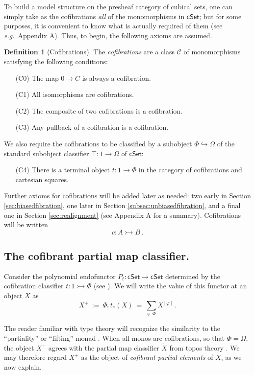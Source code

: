 \documentclass[11pt,reqno]{amsart}
\newcommand{\eg}{\emph{e.g.}}
\newcommand{\cSet}{\ensuremath{\mathsf{cSet}}}
\newcommand{\hook}{\ensuremath{\hookrightarrow}}
\newcommand{\mono}{\ensuremath{\rightarrowtail}}
\renewcommand{\to}{\ensuremath{\rightarrow}}
\theoremstyle{remark}
\theoremstyle{definition}
\newtheorem{definition}[theorem]{Definition}
\begin{document}
To build a model structure on the presheaf category of cubical sets, one can simply take as the cofibrations \emph{all} of the monomorphisms in $\cSet$; but for some purposes, it is convenient to know what is actually required of them (see \eg\ Appendix A). Thus, to begin, the following axioms are assumed.
 
\begin{definition}[Cofibrations]\label{def:cofibration}
The \emph{cofibrations} are a class $\mathcal{C}$ of monomorphisms satisfying the following conditions:
\begin{enumerate}
\item[(C0)] The map $0\to C$ is always a cofibration.
\item[(C1)] All isomorphisms are cofibrations.
\item[(C2)] The composite of two cofibrations is a cofibration.
\item[(C3)] Any pullback of a cofibration is a cofibration.
\end{enumerate}
We also require the cofibrations to be classified by a subobject $\Phi \hook \Omega$ of the standard subobject classifier $\top: 1 \to \Omega$ of $\mathsf{cSet}$:
\begin{enumerate}
\item[(C4)] There is a terminal object $t:1\to\Phi$ in the category of cofibrations and cartesian squares.
\end{enumerate}
Further axioms for cofibrations will be added later as needed: two early in Section \ref{sec:biasedfibration}, one later in Section \ref{subsec:unbiasedfibration}, and a final one in Section \ref{sec:realignment} (see Appendix A for a summary).   Cofibrations will be written 
 \[
 c : A \mono B\,.
 \]
\end{definition}

\subsection*{The cofibrant partial map classifier.}
Consider the polynomial endofunctor $P_t : \cSet\to \cSet$ determined by the cofibration classifier $t : 1 \mono \Phi$ (see  \cite{gambino-kock}).  We will write the value of this functor at an object $X$ as 
\begin{equation}\label{eq:partialmapclassifier}
X^+\ :=\ \Phi_!\,t_*(X)\ =\ \sum_{\varphi: \Phi}X^{[\varphi]}\,.
\end{equation}

The reader familiar with type theory will recognize the similarity to the ``partiality'' or ``lifting''  monad \cite{Moggi:91}.  When all monos are cofibrations, so that $\Phi = \Omega$, the object $X^+$ agrees with the partial map classifier $\widetilde{X}$ from topos theory \cite{JohnstoneTT}.  We may therefore regard $X^+$ as the object of \emph{cofibrant partial elements} of $X$, as we now explain.
\end{document}
